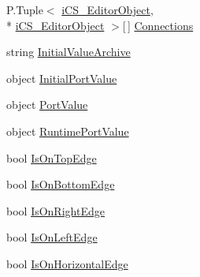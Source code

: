 \begin{DoxyCompactItemize}
\item 
P.\+Tuple$<$ \hyperlink{classi_c_s___editor_object}{i\+C\+S\+\_\+\+Editor\+Object}, \\*
\hyperlink{classi_c_s___editor_object}{i\+C\+S\+\_\+\+Editor\+Object} $>$\mbox{[}$\,$\mbox{]} \hyperlink{classi_c_s___editor_object_a98d278f17936555a489ade20c426afc2}{Connections}
\item 
string \hyperlink{classi_c_s___editor_object_afdd07667f018ee4cff4ebf4b9bf63188}{Initial\+Value\+Archive}
\item 
object \hyperlink{classi_c_s___editor_object_a09688615d6517ef1953a2b9ef6d4c23c}{Initial\+Port\+Value}
\item 
object \hyperlink{classi_c_s___editor_object_a8259185fe4a60e6da2e3db94e694b16c}{Port\+Value}
\item 
object \hyperlink{classi_c_s___editor_object_a8e635f2e584ad68ca5804a328808d70f}{Runtime\+Port\+Value}
\item 
bool \hyperlink{classi_c_s___editor_object_a1fb75fa9bd427a1c7b5b598ddacd859e}{Is\+On\+Top\+Edge}
\item 
bool \hyperlink{classi_c_s___editor_object_a21a22f3d8c44ce575a492ae67dd616b4}{Is\+On\+Bottom\+Edge}
\item 
bool \hyperlink{classi_c_s___editor_object_a234bb1b5735e5ec85d00c9a5e62b7fbd}{Is\+On\+Right\+Edge}
\item 
bool \hyperlink{classi_c_s___editor_object_a2b0c83666222292f0defdf27f041b773}{Is\+On\+Left\+Edge}
\item 
bool \hyperlink{classi_c_s___editor_object_a862573080098338a37871c8c8756c199}{Is\+On\+Horizontal\+Edge}
\item 

\end{DoxyCompactItemize}
